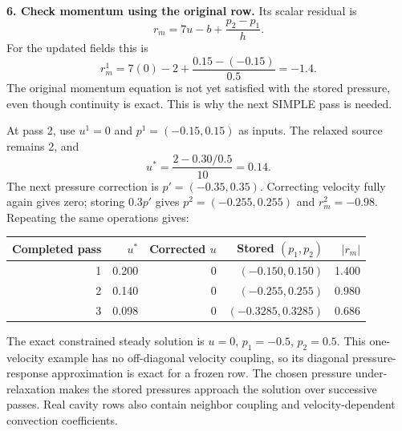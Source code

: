 \textbf{6. Check momentum using the original row.} Its scalar residual is
\[
r_m=7u-b+\frac{p_2-p_1}{h}.
\]
For the updated fields this is
\[
r_m^1=7(0)-2+\frac{0.15-(-0.15)}{0.5}=-1.4.
\]
The original momentum equation is not yet satisfied with the stored pressure,
even though continuity is exact. This is why the next SIMPLE pass is needed.

At pass 2, use $u^1=0$ and $p^1=(-0.15,0.15)$ as inputs. The relaxed source
remains 2, and
\[
u^*=\frac{2-0.30/0.5}{10}=0.14.
\]
The next pressure correction is $p'=(-0.35,0.35)$. Correcting velocity fully
again gives zero; storing $0.3p'$ gives $p^2=(-0.255,0.255)$ and
$r_m^2=-0.98$. Repeating the same operations gives:
\begin{center}\begin{tabular}{rrrrr}\toprule
Completed pass & $u^*$ & Corrected $u$ & Stored $(p_1,p_2)$ & $|r_m|$\\\midrule
1 & 0.200 & 0 & $(-0.150,0.150)$ & 1.400\\
2 & 0.140 & 0 & $(-0.255,0.255)$ & 0.980\\
3 & 0.098 & 0 & $(-0.3285,0.3285)$ & 0.686\\\bottomrule
\end{tabular}\end{center}
The exact constrained steady solution is $u=0$, $p_1=-0.5$, $p_2=0.5$.
This one-velocity example has no off-diagonal velocity coupling, so its
diagonal pressure-response approximation is exact for a frozen row.
The chosen pressure under-relaxation makes the stored pressures approach
the solution over successive passes. Real cavity rows also contain neighbor
coupling and velocity-dependent convection coefficients.
